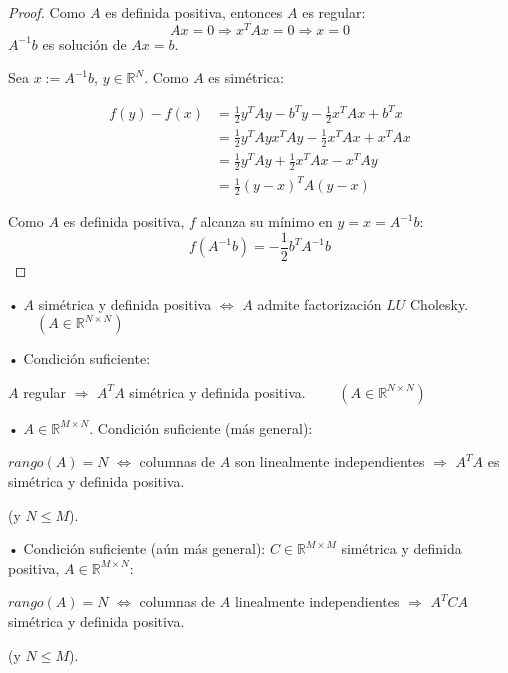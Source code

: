 \begin{proof}
Como $A$ es definida positiva, entonces $A$ es regular:
\[ Ax=0 \Rightarrow x^TAx=0 \Rightarrow x=0 \]
$A^{-1}b$ es solución de $Ax=b$.

Sea $x:=A^{-1}b$, $y \in \mathbb{R}^N$. Como $A$ es simétrica:

	\begin{equation*}
		\begin{split}
		f(y) - f(x) & = \frac{1}{2} y^TAy - b^Ty - \frac{1}{2}x^TAx + b^Tx \\
		& = \frac{1}{2}y^TAy  x^TAy - \frac{1}{2}x^TAx + x^TAx \\
		& = \frac{1}{2}y^TAy + \frac{1}{2}x^TAx - x^TAy \\
		& = \frac{1}{2}(y-x)^TA(y-x)
		\end{split}
	\end{equation*}
	
Como $A$ es definida positiva, $f$ alcanza su mínimo en $y=x=A^{-1}b$:
\[ f(A^{-1}b) = -\frac{1}{2}b^TA^{-1}b \]
	
\end{proof}

\begin{nprop}
	\begin{nlist}
	\item[•] $A$ simétrica y definida positiva $\Leftrightarrow$ $A$ admite factorización $LU$ Cholesky. $\qquad (A \in \mathbb{R}^{N \times N})$
	
	\item[•] Condición suficiente:
	
	$A$ regular $\Rightarrow$ $A^TA$ simétrica y definida positiva. $\qquad (A \in \mathbb{R}^{N \times N})$
	
	\item[•] $A \in \mathbb{R}^{M \times N}$. Condición suficiente (más general):
	
	$rango(A) = N$ $\Leftrightarrow$ columnas de $A$ son linealmente independientes $\Rightarrow$ $A^TA$ es simétrica y definida positiva.
	
	(y $N \leq M$).
	
	\item[•] Condición suficiente (aún más general): $C \in \mathbb{R}^{M \times M}$ simétrica y definida positiva, $A \in \mathbb{R}^{M \times N}$:
	
	$rango (A) = N$ $\Leftrightarrow$ columnas de $A$ linealmente independientes $\Rightarrow$ $A^TCA$ simétrica y definida positiva.
	
	(y $N \leq M$).
	
	\end{nlist}
\end{nprop}

